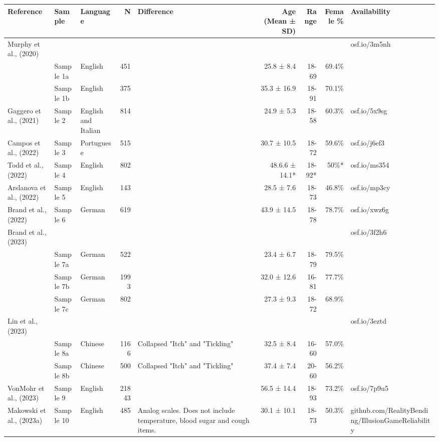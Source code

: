 \begin{table}[t]
\fontsize{6.8pt}{8.1pt}\selectfont
\begin{tabular*}{\linewidth}{@{\extracolsep{\fill}}lllrlrrrl}
\toprule
Reference & Sample & Language & N & Difference & Age (Mean  ± SD) & Range & Female \% & Availability \\ 
\midrule\addlinespace[2.5pt]
Murphy et al., (2020) &  &  &  &  &  &  &  & osf.io/3m5nh \\ 
 & Sample 1a & English & 451 &  & 25.8 ± 8.4 & 18-69 & 69.4\% &  \\ 
 & Sample 1b & English & 375 &  & 35.3 ± 16.9 & 18-91 & 70.1\% &  \\ 
Gaggero et al., (2021) & Sample 2 & English and Italian & 814 &  & 24.9 ± 5.3 & 18-58 & 60.3\% & osf.io/5x9sg \\ 
Campos et al., (2022) & Sample 3 & Portuguese & 515 &  & 30.7 ± 10.5 & 18-72 & 59.6\% & osf.io/j6ef3 \\ 
Todd et al., (2022) & Sample 4 & English & 802 &  & 48.6.6 ± 14.1* & 18-92* & 50\%* & osf.io/ms354 \\ 
Arslanova et al., (2022) & Sample 5 & English & 143 &  & 28.5 ± 7.6 & 18-73 & 46.8\% & osf.io/mp3cy \\ 
Brand et al., (2022) & Sample 6 & German & 619 &  & 43.9 ± 14.5 & 18-78 & 78.7\% & osf.io/xwz6g \\ 
Brand et al., (2023) &  &  &  &  &  &  &  & osf.io/3f2h6 \\ 
 & Sample 7a & German & 522 &  & 23.4 ± 6.7 & 18-79 & 79.5\% &  \\ 
 & Sample 7b & German & 1993 &  & 32.0 ± 12.6 & 16-81 & 77.7\% &  \\ 
 & Sample 7c & German & 802 &  & 27.3 ± 9.3 & 18-72 & 68.9\% &  \\ 
Lin et al., (2023) &  &  &  &  &  &  &  & osf.io/3eztd \\ 
 & Sample 8a & Chinese & 1166 & Collapsed "Itch" and "Tickling" & 32.5 ± 8.4 & 16-60 & 57.0\% &  \\ 
 & Sample 8b & Chinese & 500 & Collapsed "Itch" and "Tickling" & 37.4 ± 7.4 & 20-60 & 56.2\% &  \\ 
VonMohr et al., (2023) & Sample 9 & English & 21843 &  & 56.5 ± 14.4 & 18-93 & 73.2\% & osf.io/7p9u5 \\ 
Makowski et al., (2023a) & Sample 10 & English & 485 & Analog scales. Does not include temperature, blood sugar and cough items. & 30.1 ± 10.1 & 18-73 & 50.3\% & github.com/RealityBending/IllusionGameReliability \\ 

\end{tabular*}
\end{table}
